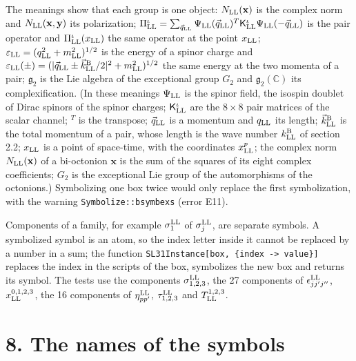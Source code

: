 \documentclass[
  10pt,
]{article}
\begin{document}
The meanings show that each group is one object:
\(N_{\rm LL}(\mathbf x)\) is the complex norm and
\(N_{\rm LL}(\mathbf x,\mathbf y)\) its polarization;
\(\Pi^\iota_{\rm LL}=\sum_{\vec q_{\rm LL}}\Psi_{\rm LL}(\vec q_{\rm LL})^T\mathsf K^\iota_{\rm LL}\Psi_{\rm LL}(-\vec q_{\rm LL})\)
is the pair operator and \(\Pi^\iota_{\rm LL}(x_{\rm LL})\) the same
operator at the point \(x_{\rm LL}\);
\(\varepsilon_{\rm LL}=(q_{\rm LL}^2+m_{\rm LL}^2)^{1/2}\) is the energy
of a spinor charge and
\(\varepsilon_{\rm LL}(\pm)=(\lvert\vec q_{\rm LL}\pm\vec k^{\rm B}_{\rm LL}/2\rvert^2+m_{\rm LL}^2)^{1/2}\)
the same energy at the two momenta of a pair; \(\mathfrak g_2\) is the
Lie algebra of the exceptional group \(G_2\) and
\(\mathfrak g_2(\mathbb C)\) its complexification. (In these meanings
\(\Psi_{\rm LL}\) is the spinor field, the isospin doublet of Dirac
spinors of the spinor charges; \(\mathsf K^\iota_{\rm LL}\) are the
\(8\times8\) pair matrices of the scalar channel; \({}^T\) is the
transpose; \(\vec q_{\rm LL}\) is a momentum and \(q_{\rm LL}\) its
length; \(\vec k^{\rm B}_{\rm LL}\) is the total momentum of a pair,
whose length is the wave number \(k^{\rm B}_{\rm LL}\) of section 2.2;
\(x_{\rm LL}\) is a point of space-time, with the coordinates
\(x^p_{\rm LL}\); the complex norm \(N_{\rm LL}(\mathbf x)\) of a
bi-octonion \(\mathbf x\) is the sum of the squares of its eight complex
coefficients; \(G_2\) is the exceptional Lie group of the automorphisms
of the octonions.) Symbolizing one box twice would only replace the
first symbolization, with the warning \texttt{Symbolize::bsymbexs}
(error E11).

Components of a family, for example \(\sigma^{\rm LL}_1\) of
\(\sigma^{\rm LL}_j\), are separate symbols. A symbolized symbol is an
atom, so the index letter inside it cannot be replaced by a number in a
sum; the function
\texttt{SL31Instance{[}box,\ \{index\ -\textgreater{}\ value\}{]}}
replaces the index in the scripts of the box, symbolizes the new box and
returns its symbol. The tests use the components
\(\sigma^{\rm LL}_{1,2,3}\), the 27 components of
\(\epsilon^{\rm LL}_{jj'j''}\), \(x^{0,1,2,3}_{\rm LL}\), the 16
components of \(\eta^{\rm LL}_{pp'}\), \(\tau^{\rm LL}_{1,2,3}\) and
\(T^{1,2,3}_{\rm LL}\).

\hypertarget{the-names-of-the-symbols}{%
\section{8. The names of the symbols}\label{the-names-of-the-symbols}}
\end{document}
